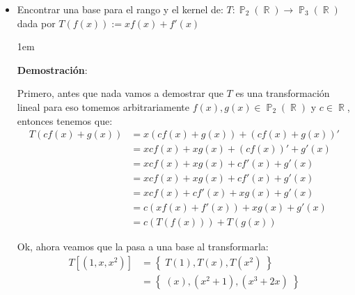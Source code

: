 \documentclass[12pt, fleqn]{report}                             %
\newenvironment{SmallIndentation}[1][0.75em]                    %
        {\begin{adjustwidth}{#1}{}\begin{footnotesize}}             %
        {\end{footnotesize}\end{adjustwidth}}                       %
\theoremstyle{break}                                            %
\DeclareMathOperator \Reals        {\mathbb{R}}                 %
\DeclareMathOperator \Polynomials  {\mathbb{P}}                 %
\newcommand{\Set}[1]    {\left\{ \; #1 \; \right\}}             %
\newcommand{\Brackets}[1]    {\left[ #1 \right]}                %
\newcommand{\Wrap}[1]    {\left( #1 \right)}                    %
\begin{document}
                \begin{itemize}

                    \item
                        Encontrar una base para el rango y el kernel de:
                        $T: \Polynomials_2(\Reals) \to \Polynomials_3(\Reals)$
                        dada por $T(f(x)) := xf(x) + f'(x)$

                        \begin{SmallIndentation}[1em]
                            \textbf{Demostración}:
                            
                            Primero, antes que nada vamos a demostrar que $T$ es una transformación lineal
                            para eso tomemos arbitrariamente $f(x), g(x) \in \Polynomials_2(\Reals)$
                            y $c \in \Reals$, entonces tenemos que:
                            \begin{align*}
                                T(cf(x) + g(x))
                                    &= x(cf(x) + g(x)) + (cf(x) + g(x))'         \\
                                    &= xcf(x) + xg(x) + (cf(x))' + g'(x)         \\
                                    &= xcf(x) + xg(x) + cf'(x) + g'(x)           \\
                                    &= xcf(x) + xg(x) + cf'(x) + g'(x)           \\
                                    &= xcf(x) + cf'(x) + xg(x) + g'(x)           \\
                                    &= c(xf(x) + f'(x)) + xg(x) + g'(x)          \\
                                    &= c(T(f(x))) + T(g(x))
                            \end{align*}

                            Ok, ahora veamos que la pasa a una base al transformarla:
                            \begin{align*}
                                T\Brackets{\Wrap{1, x, x^2}}
                                    &= \Set{T(1), T(x), T(x^2)}             \\ 
                                    &= \Set{(x), (x^2 + 1), (x^3 + 2x)}     \\ 
                            \end{align*}


\end{SmallIndentation}
\end{itemize}
\end{document}
